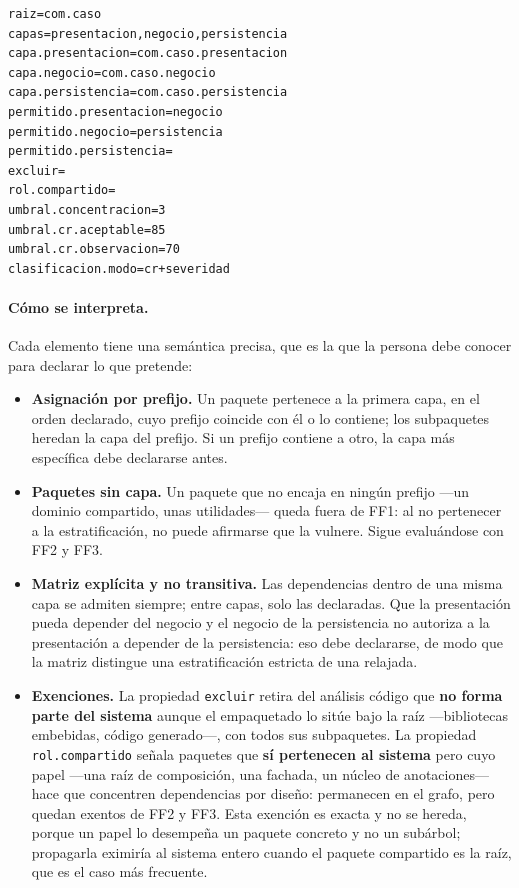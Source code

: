 \begin{verbatim}
raiz=com.caso
capas=presentacion,negocio,persistencia
capa.presentacion=com.caso.presentacion
capa.negocio=com.caso.negocio
capa.persistencia=com.caso.persistencia
permitido.presentacion=negocio
permitido.negocio=persistencia
permitido.persistencia=
excluir=
rol.compartido=
umbral.concentracion=3
umbral.cr.aceptable=85
umbral.cr.observacion=70
clasificacion.modo=cr+severidad
\end{verbatim}

\paragraph{Cómo se interpreta.} Cada elemento tiene una semántica precisa, que es la que la persona debe conocer para declarar lo que pretende:

\begin{itemize}
    \item \textbf{Asignación por prefijo.} Un paquete pertenece a la primera capa, en el orden declarado, cuyo prefijo coincide con él o lo contiene; los subpaquetes heredan la capa del prefijo. Si un prefijo contiene a otro, la capa más específica debe declararse antes.
    \item \textbf{Paquetes sin capa.} Un paquete que no encaja en ningún prefijo ---un dominio compartido, unas utilidades--- queda fuera de FF1: al no pertenecer a la estratificación, no puede afirmarse que la vulnere. Sigue evaluándose con FF2 y FF3.
    \item \textbf{Matriz explícita y no transitiva.} Las dependencias dentro de una misma capa se admiten siempre; entre capas, solo las declaradas. Que la presentación pueda depender del negocio y el negocio de la persistencia no autoriza a la presentación a depender de la persistencia: eso debe declararse, de modo que la matriz distingue una estratificación estricta de una relajada.
    \item \textbf{Exenciones.} La propiedad \texttt{excluir} retira del análisis código que \textbf{no forma parte del sistema} aunque el empaquetado lo sitúe bajo la raíz ---bibliotecas embebidas, código generado---, con todos sus subpaquetes. La propiedad \texttt{rol.compartido} señala paquetes que \textbf{sí pertenecen al sistema} pero cuyo papel ---una raíz de composición, una fachada, un núcleo de anotaciones--- hace que concentren dependencias por diseño: permanecen en el grafo, pero quedan exentos de FF2 y FF3. Esta exención es exacta y no se hereda, porque un papel lo desempeña un paquete concreto y no un subárbol; propagarla eximiría al sistema entero cuando el paquete compartido es la raíz, que es el caso más frecuente.
\end{itemize}
\label{sec:exenciones}


